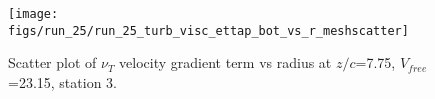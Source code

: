 \begin{figure}[H]
\centering
\texttt{[image: figs/run\_25/run\_25\_turb\_visc\_ettap\_bot\_vs\_r\_meshscatter]}
\caption{Scatter plot of $\nu_T$ velocity gradient term vs radius at $z/c$=7.75, $V_{free}$=23.15, station 3.}
\label{fig:run_25_turb_visc_ettap_bot_vs_r_meshscatter}
\end{figure}


